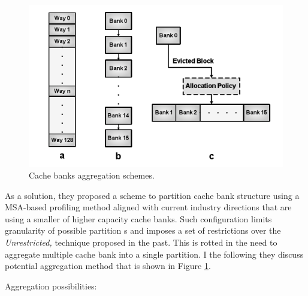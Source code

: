 \documentclass{report}
\begin{document}
\begin{figure}[t]
\includegraphics[width=1\textwidth]{./fig21}
\caption{   Cache banks aggregation schemes.}
\label{fig21}
\end{figure}


 As a solution, they proposed a scheme to partition cache bank structure using a MSA-based profiling method aligned with current industry directions that are using a smaller of higher capacity cache banks. Such configuration limits granularity of possible partition s and imposes a set of restrictions over the \emph{Unrestricted,} technique proposed in the past. This is rotted in the need to aggregate multiple cache bank into a single partition. I the following they discuss potential aggregation method that is shown in Figure \ref{fig21}.

Aggregation possibilities:
\end{document}
